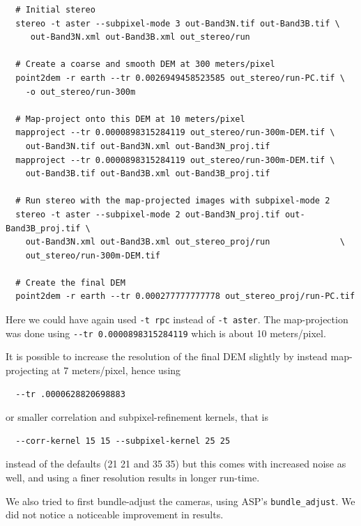 \begin{verbatim}
  # Initial stereo
  stereo -t aster --subpixel-mode 3 out-Band3N.tif out-Band3B.tif \
     out-Band3N.xml out-Band3B.xml out_stereo/run               

  # Create a coarse and smooth DEM at 300 meters/pixel
  point2dem -r earth --tr 0.0026949458523585 out_stereo/run-PC.tif \
    -o out_stereo/run-300m

  # Map-project onto this DEM at 10 meters/pixel
  mapproject --tr 0.0000898315284119 out_stereo/run-300m-DEM.tif \
    out-Band3N.tif out-Band3N.xml out-Band3N_proj.tif            
  mapproject --tr 0.0000898315284119 out_stereo/run-300m-DEM.tif \
    out-Band3B.tif out-Band3B.xml out-Band3B_proj.tif            
  
  # Run stereo with the map-projected images with subpixel-mode 2
  stereo -t aster --subpixel-mode 2 out-Band3N_proj.tif out-Band3B_proj.tif \
    out-Band3N.xml out-Band3B.xml out_stereo_proj/run              \
    out_stereo/run-300m-DEM.tif

  # Create the final DEM
  point2dem -r earth --tr 0.000277777777778 out_stereo_proj/run-PC.tif
\end{verbatim}

Here we could have again used \texttt{-t rpc} instead of \texttt{-t aster}.
The map-projection was done using \texttt{-\/-tr 0.0000898315284119}
which is about 10 meters/pixel.

It is possible to increase the resolution of the final DEM slightly
by instead map-projecting at 7 meters/pixel, hence using

\begin{verbatim}
  --tr .0000628820698883
\end{verbatim}

or smaller correlation and subpixel-refinement kernels, that is

\begin{verbatim}
  --corr-kernel 15 15 --subpixel-kernel 25 25
\end{verbatim}

instead of the defaults (21 21 and 35 35) but this comes with increased noise as well, and
using a finer resolution results in longer run-time.

We also tried to first bundle-adjust the cameras, using ASP's \texttt{bundle\_adjust}.
We did not notice a noticeable improvement in results. 

